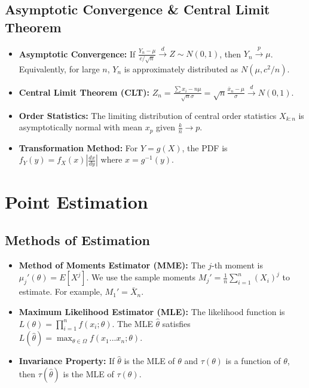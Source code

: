 \documentclass[12pt,a4paper]{article}
\begin{document}
\subsection{Asymptotic Convergence \& Central Limit Theorem}
\begin{itemize}
    \item \textbf{Asymptotic Convergence:} If
    $\frac{Y_n-\mu}{c/\sqrt{n}} \xrightarrow{d} Z \sim N(0,1)$, then
    $Y_n \xrightarrow{p} \mu$. Equivalently, for large $n$,
    $Y_n$ is approximately distributed as $N(\mu,c^2/n)$.
    \item \textbf{Central Limit Theorem (CLT):} $Z_n = \frac{\sum x_i - n\mu}{\sqrt{n}\sigma} = \sqrt{n}\frac{\bar{x}_n - \mu}{\sigma} \xrightarrow{d} N(0,1)$.
    \item \textbf{Order Statistics:} The limiting distribution of central order statistics $X_{k:n}$ is asymptotically normal with mean $x_p$ given $\frac{k}{n} \rightarrow p$.
    \item \textbf{Transformation Method:} For $Y=g(X)$, the PDF is $f_Y(y)=f_X(x)|\frac{dx}{dy}|$ where $x=g^{-1}(y)$.
\end{itemize}


\section{Point Estimation}

\subsection{Methods of Estimation}
\begin{itemize}
    \item \textbf{Method of Moments Estimator (MME):} The $j$-th moment is $\mu_j'(\theta) = E[X^j]$. We use the sample moments $M_j' = \frac{1}{n}\sum_{i=1}^n (X_i)^j$ to estimate. For example, $M_1' = \bar{X}_n$.
    \item \textbf{Maximum Likelihood Estimator (MLE):} The likelihood function is $L(\theta) = \prod_{i=1}^n f(x_i;\theta)$. The MLE $\hat{\theta}$ satisfies $L(\hat{\theta}) = \max_{\theta\in\Omega}f(x_1...x_n;\theta)$.
    \item \textbf{Invariance Property:} If $\hat{\theta}$ is the MLE of $\theta$ and $\tau(\theta)$ is a function of $\theta$, then $\tau(\hat{\theta})$ is the MLE of $\tau(\theta)$.
\end{itemize}
\end{document}
